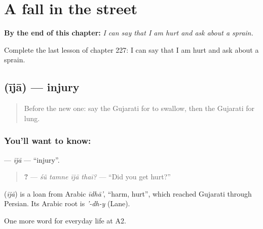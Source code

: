 
\chapter{A fall in the street}
\label{ch:gu-a-fall-in-the-street}

\begin{chapteropening}
\textbf{By the end of this chapter:} \emph{I can say that I am hurt and ask about a sprain.}

Complete the last lesson of chapter 227: I can say that I am hurt and ask about a sprain.
\end{chapteropening}

\section[\texorpdfstring{\gu{ઈજા} (ījā)}{ઈજા (ījā)}]{ (ījā) — injury}

\label{lesson:GU-C227-ija}



\begin{quote}
Before the new one: say the Gujarati for to swallow, then the Gujarati for lung.
\end{quote}

\subsection*{You'll want to know: }
\textbf{} — \emph{ījā} — \textquotedblleft{}injury\textquotedblright{}.

\begin{quote}
\textbf{   ?} — \emph{śũ tamne ījā thaī?} — \textquotedblleft{}Did you get hurt?\textquotedblright{}
\end{quote}

\begin{cousinweb}
\textbf{} (\emph{ījā}) is a loan from Arabic \emph{īdhā'}, \textquotedblleft{}harm, hurt\textquotedblright{}, which reached Gujarati through Persian. Its Arabic root is \emph{'-dh-y} (Lane).
\end{cousinweb}

\begin{grammarlens}[title={What you've built}]
One more word for everyday life at A2.
\end{grammarlens}

